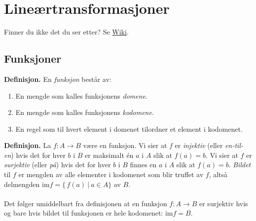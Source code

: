 \documentclass{article}
\begin{document}
\clearpage
\section{Lineærtransformasjoner}
Finner du ikke det du ser etter? Se \href{https://www.math.ntnu.no/emner/TMA4110/2020h/notater/8-lineartransformasjoner.pdf}{Wiki}.


\subsection{Funksjoner}
\textbf{Definisjon.} En \textit{funksjon} består av:
\begin{enumerate}
    \item En mengde som kalles funksjonens \textit{domene}.
    \item En mengde som kalles funksjonens \textit{kodomene}.
    \item En regel som til hvert element i domenet tilordner et element i kodomenet.
\end{enumerate}
\textbf{Definisjon.} La $f: A \rightarrow B$ være en funksjon. Vi sier at $f$ er \textit{injektiv} (eller \textit{en-til-en}) hvis det for hver $b$ i $B$ er maksimalt én $a$ i $A$ slik at $f(a) = b$. Vi sier at $f$ er \textit{surjektiv} (eller \textit{på}) hvis det for hver $b$ i $B$ finnes en $a$ i $A$ slik at $f(a) = b$. \textit{Bildet} til $f$ er mengden av alle elementer i kodomenet som blir truffet av $f$, altså delmengden $\text{im} f = \{\, f(a) \ | \ a \in A \}$ av $B$.
\\\\
Det følger umiddelbart fra definisjonen at en funksjon $f: A \rightarrow B$ er surjektiv hvis og bare hvis bildet til funksjonen er hele kodomenet: $\text{im} f = B$.
\end{document}
